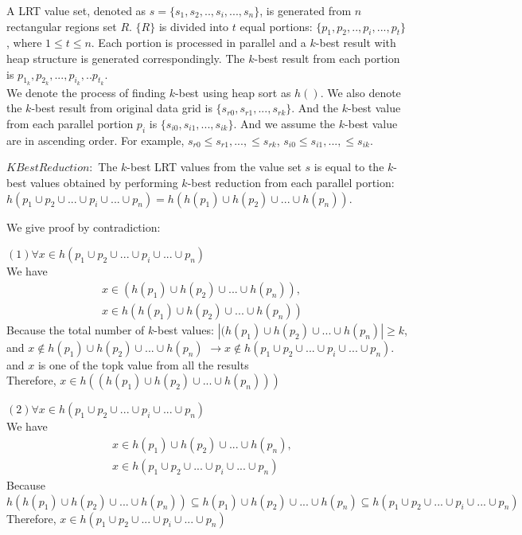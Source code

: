 \documentclass[AMA,LATO1COL]{WileyNJD-v2-bak}
\begin{document}
A LRT value set, denoted as $s=\{s_1,s_2, .., s_i,...,s_n\}$, is generated from $n$ rectangular regions set ${R}$. $\{R\}$ is divided into $t$ equal portions: $\{p_1,p_2,..,p_i,...,p_t\}$, where $1\le t\le n$. Each portion is processed in parallel and a $k$-best result with heap structure is generated correspondingly. The $k$-best result from each portion is $p_{1_k},p_{2_k},...,p_{i_k},..p_{t_k}$.\\ We denote the process of finding $k$-best using heap sort as $h()$. We also denote the $k$-best result from original data grid is $\{s_{r0},s_{r1},...,s_{rk}\}$. And the $k$-best value from each parallel portion $p_i$ is $\{s_{i0},s_{i1},...,s_{ik}\}$. And we assume the $k$-best value are in ascending order. For example, $s_{r0}\le s_{r1},...,\le s_{rk}$, $s_{i0}\le s_{i1},...,\le s_{ik}$.
\begin{lemma}{\bf $KBestReduction:$} The $k$-best LRT values from the value set ${s}$ is equal to the $k$-best values obtained by performing $k$-best reduction from each parallel portion:
$h(p_1\cup p_2\cup ...\cup p_i \cup...\cup p_n)=h(h(p_1)\cup h(p_2)\cup ...\cup h(p_n))$.
\end{lemma}
We give proof by contradiction:

\noindent $(1)\forall x\in h(p_1\cup p_2\cup ...\cup p_i \cup...\cup p_n)$\\
We have
\vspace{-5mm}
\begin{eqnarray}
x\in (h(p_1)\cup h(p_2)\cup ...\cup h(p_n)),&\\
 x\in h(h(p_1)\cup h(p_2)\cup ...\cup h(p_n))
\end{eqnarray}
Because the total number of $k$-best values:
$|(h(p_1)\cup h(p_2)\cup ...\cup h(p_n)|\ge k$, \\
and $x \notin h(p_1)\cup h(p_2)\cup ...\cup h(p_n)$ $\rightarrow x \notin h(p_1\cup p_2\cup ...\cup p_i \cup...\cup p_n)$.\\   and $x$ is one of the topk value from all the results\\
Therefore, $x\in h((h(p_1)\cup h(p_2)\cup ...\cup h(p_n)))$

\noindent $(2) \forall x\in h(p_1\cup p_2\cup ...\cup p_i \cup...\cup p_n)$\\
We have
\vspace{-5mm}
\begin{eqnarray}
x\in h(p_1)\cup h(p_2)\cup ...\cup h(p_n),&\\
x\in h(p_1\cup p_2\cup ...\cup p_i \cup...\cup p_n)
\end{eqnarray}
Because $h(h(p_1)\cup h(p_2)\cup ...\cup h(p_n))\subseteq h(p_1)\cup h(p_2)\cup ...\cup h(p_n) \subseteq h(p_1\cup p_2\cup ...\cup p_i \cup...\cup p_n)$\\
Therefore, $x\in h(p_1\cup p_2\cup ...\cup p_i \cup...\cup p_n)$
\end{document}
